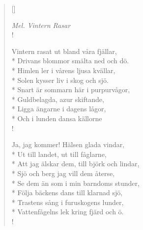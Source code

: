 \settowidth{\versewidth}{Himlen ler i vårens ljusa kvällar,}


\begin{verse}[\versewidth]

\flagverse{}
\emph{Mel. Vintern Rasar}\\!

Vintern rasat ut bland våra fjällar,\\*
Drivans blommor smälta ned och dö.\\*
Himlen ler i vårens ljusa kvällar,\\*
Solen kysser liv i skog och sjö.\\*
Snart är sommarn här i purpurvågor,\\*
Guldbelagda, azur skiftande,\\*
Ligga ängarne i dagens lågor,\\*
Och i lunden dansa källorne\\!


Ja, jag kommer! Hälsen glada vindar,\\*
Ut till landet, ut till fåglarne,\\* 
Att jag älskar dem, till björk och lindar,\\* 
Sjö och berg jag vill dem återse,\\* 
Se dem än som i min barndoms stunder,\\* 
Följa bäckens dans till klarnad sjö,\\* 
Trastens sång i furuskogens lunder,\\* 
Vattenfågelns lek kring fjärd och ö.\\!




\end{verse}

